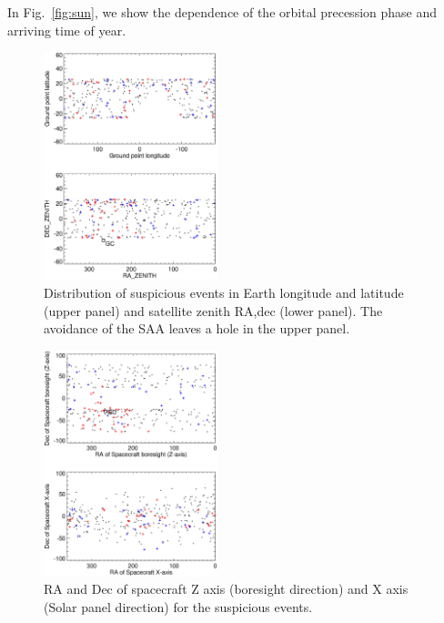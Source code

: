 \documentclass[aps,twocolumn,prd,superscriptaddress,showpacs,nofootinbib,fixfloat]{revtex4}
\begin{document}
In Fig.~\ref{fig:sun}, we show the dependence of the orbital
precession phase and arriving time of year.



\begin{figure}
  \centering
  \includegraphics[width=0.45\textwidth]{plots/geo-lonlat.ps}
  \caption{Distribution of suspicious events in Earth
  longitude and latitude (upper panel) and satellite zenith
  RA,dec (lower panel).   The avoidance of the SAA leaves a
  hole in the upper panel.}
  \label{fig:geo-lonlat}
\end{figure}

\begin{figure}
  \centering
  \includegraphics[width=0.45\textwidth]{plots/spacecraft-zx.ps}
  \caption{RA and Dec of spacecraft Z axis (boresight
  direction) and X axis (Solar panel direction) for the
  suspicious events.  }
  \label{fig:spacecraft-zx}
\end{figure}
\end{document}

